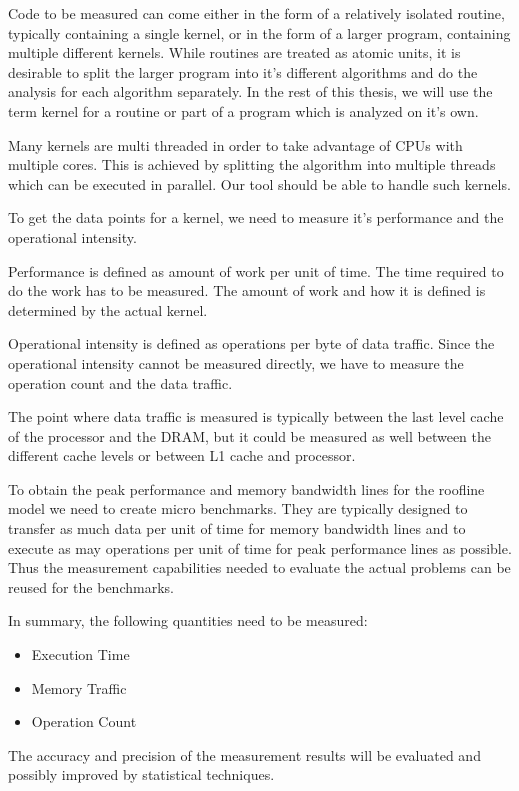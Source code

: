 \documentclass[a4paper,12pt]{article}
\begin{document}
Code to be measured can come either in the form of a relatively isolated
routine, typically containing a single kernel, or in the form of a larger
program, containing multiple different kernels. While routines are treated as
atomic units, it is desirable to split the larger program into it's different
algorithms and do the analysis for each algorithm separately. In the rest of
this thesis, we will use the term kernel for a routine or part of a program
which is analyzed on it's own.

Many kernels are multi threaded in order to take advantage of CPUs with multiple
cores. This is achieved by splitting the algorithm into multiple threads which
can be executed in parallel. Our tool should be able to handle such kernels.

To get the data points for a kernel, we need to measure it's performance and
the operational intensity.

Performance is defined as amount of work per unit of time. The time required to
do the work has to be measured. The amount of work and how it is defined is
determined by the actual kernel. 

Operational intensity is defined as operations per byte of data traffic. Since
the operational intensity cannot be measured directly, we have to measure the
operation count and the data traffic.

The point where data traffic is measured is typically between the last level
cache of the processor and the DRAM, but it could be measured as well between
the different cache levels or between L1 cache and processor.

To obtain the peak performance and memory bandwidth lines for the roofline model
we need to create micro benchmarks. They are typically designed to transfer as
much data per unit of time for memory bandwidth lines and to execute as may
operations per unit of time for peak performance lines as possible. Thus the
measurement capabilities needed to evaluate the actual problems can be reused
for the benchmarks.

In summary, the following quantities need to be measured:
\begin{itemize}
\item Execution Time
\item Memory Traffic
\item Operation Count
\end{itemize}

The accuracy and precision of the measurement results will be evaluated and
possibly improved by statistical techniques.
\end{document}
